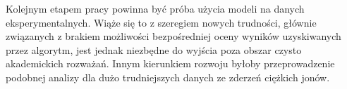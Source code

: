 Kolejnym etapem pracy powinna być próba użycia modeli na danych eksperymentalnych. Wiąże się to z szeregiem nowych trudności, głównie związanych z brakiem możliwości bezpośredniej oceny wyników uzyskiwanych przez algorytm, jest jednak niezbędne do wyjścia poza obszar czysto akademickich rozważań.
Innym kierunkiem rozwoju byłoby przeprowadzenie podobnej analizy dla dużo trudniejszych danych ze zderzeń ciężkich jonów.

